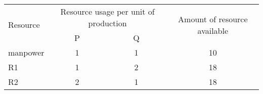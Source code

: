 \begin{center}
\begin{tabular}{|p{2.2cm}|c|c|c|}
\hline
\multirow{2}{*}{Resource} & \multicolumn{2}{c|}{Resource usage per unit of production} & \multirow{2}{*}{Amount of resource available} \\
\cline{2-3}
& P & Q & \\
\hline
manpower & 1 & 1 & 10 \\
\hline
R1 & 1 & 2 & 18 \\
\hline
R2 & 2 & 1 & 18 \\
\hline
\end{tabular}
\end{center}
